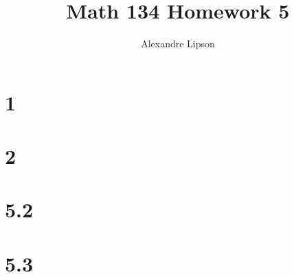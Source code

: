 \documentclass{article}
\title{Math 134 Homework 5}
\author{Alexandre Lipson}
\begin{document}
\maketitle

\section*{1}


\section*{2}


\section*{5.2}


\section*{5.3}

\end{document}
